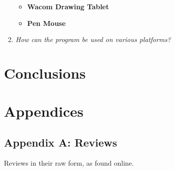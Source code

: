 \documentclass[a4paper,12pt]{article}
\begin{document}
\begin{enumerate}
  \begin{itemize}
  \item \textbf{Wacom Drawing Tablet}
  \item \textbf{Pen Mouse}
  \end{itemize}
  
\item \textit{How can the program be used on various platforms?}\\
  
\end{enumerate}

\section{Conclusions}

\newpage
\section{Appendices}

\subsection{Appendix A: Reviews}

Reviews in their raw form, as found online. 
\end{document}
